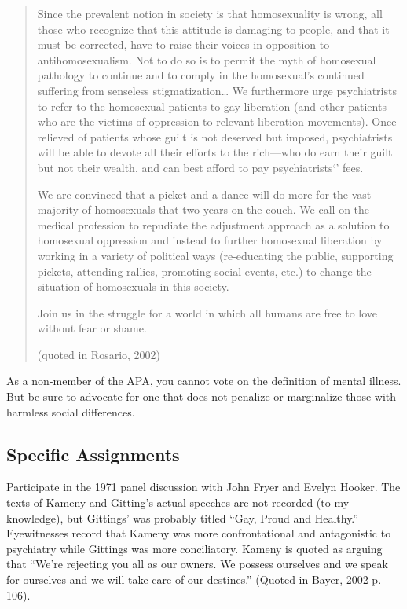 \begin{quote}
Since the prevalent notion in society is that homosexuality is wrong, all those who recognize that this attitude is damaging to people, and that it must be corrected, have to raise their voices in opposition to antihomosexualism. Not to do so is to permit the myth of homosexual pathology to continue and to comply in the homosexual's continued suffering from senseless stigmatization{\ldots} We furthermore urge psychiatrists to refer to the homosexual patients to gay liberation (and other patients who are the victims of oppression to relevant liberation movements). Once relieved of patients whose guilt is not deserved but imposed, psychiatrists will be able to devote all their efforts to the rich---who do earn their guilt but not their wealth, and can best afford to pay psychiatrists`' fees.

We are convinced that a picket and a dance will do more for the vast majority of homosexuals that two years on the couch. We call on the medical profession to repudiate the adjustment approach as a solution to homosexual oppression and instead to further homosexual liberation by working in a variety of political ways (re-educating the public, supporting pickets, attending rallies, promoting social events, etc.) to change the situation of homosexuals in this society.

Join us in the struggle for a world in which all humans are free to love without fear or shame.

(quoted in Rosario, 2002)
\end{quote}

As a non-member of the APA, you cannot vote on the definition of mental illness. But be sure to advocate for one that does not penalize or marginalize those with harmless social differences.

\subsection{Specific Assignments}
\label{specificassignments}

Participate in the 1971 panel discussion with John Fryer and Evelyn Hooker. The texts of Kameny and Gitting's actual speeches are not recorded (to my knowledge), but Gittings' was probably titled ``Gay, Proud and Healthy.'' Eyewitnesses record that Kameny was more confrontational and antagonistic to psychiatry while Gittings was more conciliatory. Kameny is quoted as arguing that ``We're rejecting you all as our owners. We possess ourselves and we speak for ourselves and we will take care of our destines.'' (Quoted in Bayer, 2002 p. 106).

